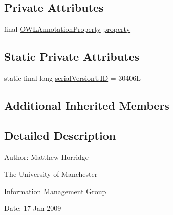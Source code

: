 \subsection*{Private Attributes}
\begin{DoxyCompactItemize}
\item 
final \hyperlink{interfaceorg_1_1semanticweb_1_1owlapi_1_1model_1_1_o_w_l_annotation_property}{O\-W\-L\-Annotation\-Property} \hyperlink{classuk_1_1ac_1_1manchester_1_1cs_1_1owl_1_1owlapi_1_1_o_w_l_annotation_property_range_axiom_impl_a54be06db2f3b475d3d46d17b0c97253e}{property}
\end{DoxyCompactItemize}
\subsection*{Static Private Attributes}
\begin{DoxyCompactItemize}
\item 
static final long \hyperlink{classuk_1_1ac_1_1manchester_1_1cs_1_1owl_1_1owlapi_1_1_o_w_l_annotation_property_range_axiom_impl_a929cdd56a29e2f960e193bd84872385e}{serial\-Version\-U\-I\-D} = 30406\-L
\end{DoxyCompactItemize}
\subsection*{Additional Inherited Members}


\subsection{Detailed Description}
Author\-: Matthew Horridge\par
 The University of Manchester\par
 Information Management Group\par
 Date\-: 17-\/\-Jan-\/2009 

